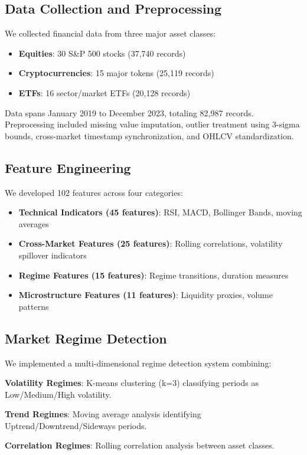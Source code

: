 \documentclass[conference]{IEEEtran}
\begin{document}
\subsection{Data Collection and Preprocessing}
We collected financial data from three major asset classes:
\begin{itemize}
    \item \textbf{Equities}: 30 S\&P 500 stocks (37,740 records)
    \item \textbf{Cryptocurrencies}: 15 major tokens (25,119 records)
    \item \textbf{ETFs}: 16 sector/market ETFs (20,128 records)
\end{itemize}

Data spans January 2019 to December 2023, totaling 82,987 records. Preprocessing included missing value imputation, outlier treatment using 3-sigma bounds, cross-market timestamp synchronization, and OHLCV standardization.

\subsection{Feature Engineering}
We developed 102 features across four categories:
\begin{itemize}
    \item \textbf{Technical Indicators (45 features)}: RSI, MACD, Bollinger Bands, moving averages
    \item \textbf{Cross-Market Features (25 features)}: Rolling correlations, volatility spillover indicators
    \item \textbf{Regime Features (15 features)}: Regime transitions, duration measures
    \item \textbf{Microstructure Features (11 features)}: Liquidity proxies, volume patterns
\end{itemize}

\subsection{Market Regime Detection}
We implemented a multi-dimensional regime detection system combining:

\textbf{Volatility Regimes}: K-means clustering (k=3) classifying periods as Low/Medium/High volatility.

\textbf{Trend Regimes}: Moving average analysis identifying Uptrend/Downtrend/Sideways periods.

\textbf{Correlation Regimes}: Rolling correlation analysis between asset classes.
\end{document}
